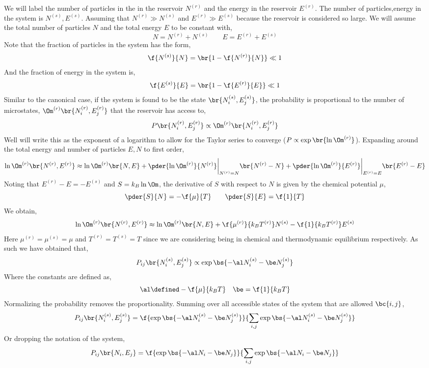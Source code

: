 \documentclass{article}
\begin{document}
{We will label the number of particles in the in the reservoir $N^{(r)}$ and the energy in the reservoir $E^{(r)}$. The number of particles,energy in the system is $N^{(s)}, E^{(s)}$. Assuming that $N^{(r)} \gg N^{(s)}$ and $E^{(r)} \gg E^{(s)}$ because the reservoir is considered so large. We will assume the total number of particles $N$ and the total energy $E$ to be constant with,
\[ N = N^{(r)} + N^{(s)} \qquad E = E^{(r)} + E^{(s)} \]
Note that the fraction of particles in the system has the form,
\[  \f{N^{(s)}}{N} = \br{1 - \f{N^{(r)}}{N}} \ll 1 \]
And the fraction of energy in the system is,
\[  \f{E^{(s)}}{E} = \br{1 - \f{E^{(r)}}{E}} \ll 1 \]
Similar to the canonical case, if the system is found to be the state $\br{N^{(s)}_i,E^{(s)}_j}$, the probability is proportional to the number of microstates, $\Om^{(r)}\br{N^{(r)}_i,E^{(r)}_j}$ that the reservoir has access to,
\[  P\br{N^{(r)}_i,E^{(r)}_j} \propto \Om^{(r)}\br{N^{(r)}_i,E^{(r)}_j} \]
Well will write this as the exponent of a logarithm to allow for the Taylor series to converge ($P \propto \exp \br{\ln \Om^{(r)}}$). Expanding around the total energy and number of particles $E,N$ to first order,
\[ \ln \Om^{(r)} \br{N^{(r)},E^{(r)}} \approx \ln \Om^{(r)} \br{N,E} + \pder{\ln \Om^{(r)}}{N^{(r)}} \bigg\rvert_{N^{(r)} = N} \br{N^{(r)} - N} + \pder{\ln \Om^{(r)}}{E^{(r)}} \bigg\rvert_{E^{(r)} = E} \br{E^{(r)} - E} \]
Noting that $E^{(r)} - E = - E^{(s)}$ and $S = k_B \ln \Om$, the derivative of $S$ with respect to $N$ is given by the chemical potential $\mu$,
\[ \pder{S}{N} = - \f{\mu}{T} \qquad \pder{S}{E} = \f{1}{T} \]
We obtain,
\[ \ln \Om^{(r)} \br{N^{(r)},E^{(r)}} \approx \ln \Om^{(r)} \br{N,E} + \f{\mu^{(r)}}{k_B T^{(r)}} N^{(s)} - \f{1}{k_B T^{(r)}} E^{(s)} \]
Here $\mu^{(r)} = \mu^{(s)} = \mu$ and $T^{(r)} = T^{(s)} = T$ since we are considering being in chemical and thermodynamic equilibrium respectively. As such we have obtained that,
\[ P_{ij}\br{N^{(s)}_i,E^{(s)}_j} \propto \exp\bs{-\al N^{(s)}_i - \be N^{(s)}_j} \]
Where the constants are defined as,
\[ \al \defined -\f{\mu}{k_B T}  \quad \be = \f{1}{k_B T} \]
Normalizing the probability removes the proportionality. Summing over all accessible states of the system that are allowed $\bc{i,j}$,
\[ P_{ij}\br{N^{(s)}_i,E^{(s)}_j} =  \f{\exp\bs{-\al N^{(s)}_i - \be N^{(s)}_j}}{\sum_{i,j}\exp\bs{-\al N^{(s)}_i - \be N^{(s)}_j}} \]
Or dropping the notation of the system,
\[ P_{ij}\br{N_i,E_j} =  \f{\exp\bs{-\al N_i - \be N_j}}{\sum_{i,j}\exp\bs{-\al N_i - \be N_j}} \]

}
\end{document}

